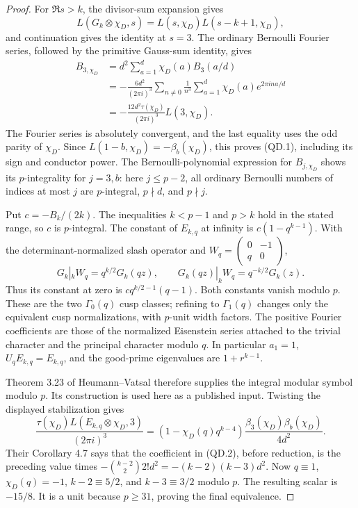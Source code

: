 \begin{proof}
For $\Re s>k$, the divisor-sum expansion gives
\[
 L(G_k\otimes\chi_D,s)=L(s,\chi_D)L(s-k+1,\chi_D),
\]
and continuation gives the identity at $s=3$.  The ordinary Bernoulli
Fourier series, followed by the primitive Gauss-sum identity, gives
\[
 \begin{split}
 B_{3,\chi_D}
 &=d^2\sum_{a=1}^{d}\chi_D(a)B_3(a/d)\\
 &=-\frac{6d^2}{(2\pi i)^3}
       \sum_{n\ne0}\frac{1}{n^3}
           \sum_{a=1}^{d}\chi_D(a)e^{2\pi ina/d}\\
 &=-\frac{12d^2\tau(\chi_D)}{(2\pi i)^3}L(3,\chi_D).
 \end{split}
\]
The Fourier series is absolutely convergent, and the last equality uses
the odd parity of $\chi_D$.  Since $L(1-b,\chi_D)=-\beta_b(\chi_D)$,
this proves (QD.1), including its sign and conductor power.
The Bernoulli-polynomial expression for $B_{j,\chi_D}$ shows its
$p$-integrality for $j=3,b$: here $j\leq p-2$, all ordinary Bernoulli
numbers of indices at most $j$ are $p$-integral, $p\nmid d$, and
$p\nmid j$.

Put $c=-B_k/(2k)$.  The inequalities $k<p-1$ and $p>k$ hold in the
stated range, so $c$ is $p$-integral.  The constant of $E_{k,q}$ at
infinity is $c(1-q^{k-1})$.  With the determinant-normalized slash
operator and $W_q=\left(\begin{smallmatrix}0&-1\\q&0\end{smallmatrix}\right)$,
\[
 G_k|_kW_q=q^{k/2}G_k(qz),\qquad
 G_k(qz)|_kW_q=q^{-k/2}G_k(z).
\]
Thus its constant at zero is $c q^{k/2-1}(q-1)$.  Both constants
vanish modulo $p$.  These are the two $\Gamma_0(q)$ cusp classes;
refining to $\Gamma_1(q)$ changes only the equivalent cusp
normalizations, with $p$-unit width factors.  The positive Fourier
coefficients are those of the normalized Eisenstein series attached to
the trivial character and the principal character modulo $q$.
In particular $a_1=1$, $U_qE_{k,q}=E_{k,q}$, and the good-prime
eigenvalues are $1+r^{k-1}$.

Theorem 3.23 of Heumann--Vatsal therefore supplies the integral modular
symbol modulo $p$.  Its construction is used here as a published input.
Twisting the displayed stabilization gives
\[
 \frac{\tau(\chi_D)L(E_{k,q}\otimes\chi_D,3)}{(2\pi i)^3}
  =(1-\chi_D(q)q^{k-4})
        \frac{\beta_3(\chi_D)\beta_b(\chi_D)}{4d^2}.
\]
Their Corollary 4.7 says that the coefficient in (QD.2), before
reduction, is the preceding value times
$-\binom{k-2}{2}2!d^2=-(k-2)(k-3)d^2$.
Now $q\equiv1$, $\chi_D(q)=-1$, $k-2\equiv5/2$, and
$k-3\equiv3/2$ modulo $p$.  The resulting scalar is $-15/8$.
It is a unit because $p\geq31$, proving the final equivalence.
\end{proof}

